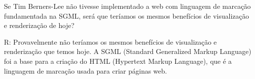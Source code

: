 Se Tim Berners-Lee não tivesse implementado a web com
linguagem de marcação fundamentada na SGML, será
que teríamos os mesmos benefícios de visualização e
renderização de hoje?

R: Provavelmente não teríamos os mesmos benefícios de visualização e renderização que temos hoje.
A SGML (Standard Generalized Markup Language) foi a base para a criação do HTML (Hypertext Markup Language), 
que é a linguagem de marcação usada para criar páginas web. 